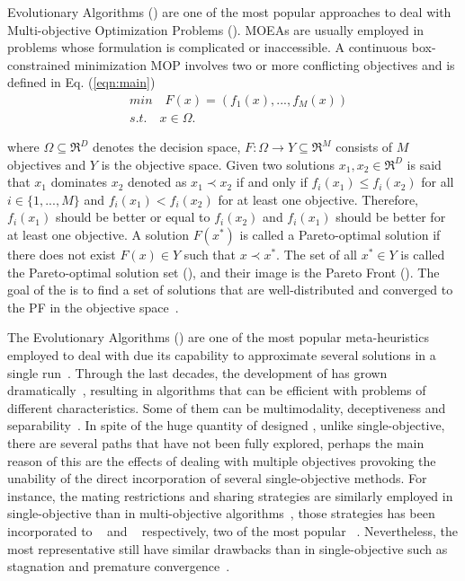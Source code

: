  Evolutionary Algorithms (\MOEAS{}) are one of the most popular approaches to deal with Multi-objective Optimization Problems (\MOPS{}).
%
MOEAs are usually employed in problems whose formulation is complicated or inaccessible.
%
A continuous box-constrained minimization MOP involves two or more conflicting objectives and is defined in Eq. (\ref{eqn:main})
%
\begin{equation}\label{eqn:main}
\begin{split}
&min \quad F(x) = (f_1(x), ..., f_M(x)) \\
&s.t. \quad x \in \Omega.
\end{split}
\end{equation}

where $\Omega \subseteq \Re^D$ denotes the decision space, $F: \Omega \rightarrow Y \subseteq \Re^M$ consists of $M$ objectives and $Y$ is the objective space.
%
Given two solutions $x_1, x_2 \in \Re^D$ is said that $x_1$ dominates $x_2$ denoted as $x_1 \prec x_2$ if and only if $f_i(x_1) \leq f_i(x_2)$ for all $i \in \{1,...,M\}$ and $f_i(x_1) < f_i(x_2)$ for at least one objective.
%
Therefore, $f_i(x_1)$ should be better or equal to $f_i(x_2)$ and $f_i(x_1)$ should be better for at least one objective.
%
A solution $F(x^*)$ is called a Pareto-optimal solution if there does not exist $F(x) \in Y$ such that $x \prec x^*$.
%
The set of all $x^* \in Y$ is called the Pareto-optimal solution set (\PS{}), and their image is the Pareto Front (\PF{}).
%
The goal of the \MOEAS{} is to find a set of solutions that are well-distributed and converged to the PF in the objective space~\cite{trivedi2016survey}.
%

The Evolutionary Algorithms (\EAS{}) are one of the most popular meta-heuristics employed to deal with \MOPS{} due its capability to approximate several solutions in a single run~\cite{das2011real, zhou2011multiobjective}.
%
Through the last decades, the development of \MOEAS{} has grown dramatically~\cite{van1998multiobjective, coello2007mop}, resulting in algorithms that can be efficient with problems of different characteristics.
%
Some of them can be multimodality, deceptiveness and separability~\cite{huband2006review}.
%
In spite of the huge quantity of designed \MOEAS{}, unlike single-objective, there are several paths that have not been fully explored, perhaps the main reason of this are the effects of dealing with multiple objectives provoking the unability of the direct incorporation of several single-objective methods.
%
For instance, the mating restrictions and sharing strategies are similarly employed in single-objective than in multi-objective algorithms~\cite{fonseca1995multiobjective}, those strategies has been incorporated to \MOEAD{}~\cite{zhang2007moea} and \NSGAII{}~\cite{deb2002fast} respectively, two of the most popular \MOEAS{}~\cite{trivedi2016survey, zhou2011multiobjective}.
%
Nevertheless, the most representative \MOEAS{} still have similar drawbacks than in single-objective such as stagnation and premature convergence~\cite{ishibuchi2006comparison, castillo2017multi, buche2003self, lu2002dynamic}.
%

